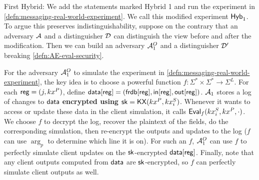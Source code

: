 

First Hybrid: We add the statements marked Hybrid 1 and run the experiment in \cref{defn:messaging-real-world-experiment}. We call this modified experiment $\mathsf{Hyb}_1$. To argue this preserves indistinguishability, suppose on the contrary that an adversary $\mathcal{A}$ and a distinguisher $\mathcal{D}$ can distinguish the view before and after the modification. Then we can build an adversary $\mathcal{A}_1^O$ and a distinguisher $\mathcal{D}'$ breaking \cref{defn:AE-eval-security}. 

For the adversary $\mathcal{A}_1^O$ to simulate the experiment in \cref{defn:messaging-real-world-experiment}, the key idea is to choose a powerful function $f: \Sigma^* \times \Sigma^* \to \Sigma^L$. For each $\mathsf{reg} = (j, kx^P)$, define $\mathsf{data}[\mathsf{reg}] = (\mathsf{frdb}[\mathsf{reg}], \mathsf{in}[\mathsf{reg}], \mathsf{out}[\mathsf{reg}])$. $\mathcal{A}_1$ stores a log of changes to $\mathsf{data}$ \textbf{encrypted using ${\mathsf{sk}} = \mathsf{KX}(kx^P, kx_i^S)$}. Whenever it wants to access or update these data in the client simulation, it calls $\mathsf{Eval}_f(kx_i^S, kx^P, \cdot)$. We choose $f$ to decrypt the log, recover the plaintext of the fields, do the corresponding simulation, then re-encrypt the outputs and updates to the log ($f$ can use $\arg_p$ to determine which line it is on). For such an $f$, $\mathcal{A}_1^O$ can use $f$ to perfectly simulate client updates on the ${\mathsf{sk}}$-encrypted $\mathsf{data}[\mathsf{reg}]$. Finally, note that any client outputs computed from $\mathsf{data}$ are ${\mathsf{sk}}$-encrypted, so $f$ can perfectly simulate client outputs as well. 

